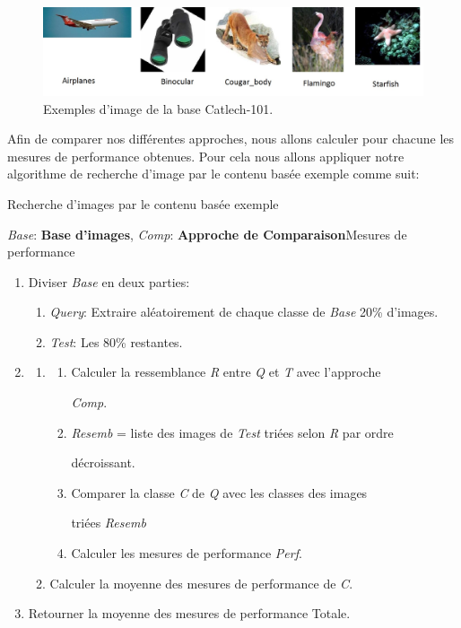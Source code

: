 \begin{figure}[H]
	\centering
		\includegraphics[width=7in]{Figures/caltech101.jpg}
	\caption[An Electron]{Exemples d'image de la base Catlech-101.}
	\label{fig:Electron}
\end{figure}	
	
	
	Afin de comparer nos différentes approches, nous allons calculer pour chacune les mesures de performance obtenues. Pour cela nous allons appliquer notre algorithme de recherche d'image par le contenu basée exemple comme suit:


\begin{algorithme}[H]
\caption{Recherche d'images par le contenu basée exemple}
{\textit{Base}: \textbf{Base d'images}, \textit{Comp}: \textbf{Approche de Comparaison}}{Mesures de performance}
{
\begin{enumerate}


\item Diviser \textit{Base} en deux parties:
\begin{enumerate}[a]
\item \textit{Query}: Extraire aléatoirement de chaque classe de \textit{Base} 20\% d'images.
\item \textit{Test}: Les 80\% restantes.
\end{enumerate}

\item {}
{
\begin{enumerate}
\item {}
{
	\begin{enumerate}[a]
	\item {}
	{
		Calculer la ressemblance \textit{R} entre \textit{Q} et \textit{T} avec l'approche 
		
		\textit{Comp}.
	}
	\item \textit{Resemb} = liste des images de \textit{Test} triées selon \textit{R} par ordre 
	
	
	décroissant.
	\item Comparer la classe \textit{C} de \textit{Q} avec les classes des images 
	
	triées \textit{Resemb}
	\item Calculer les mesures de performance \textit{Perf}.
	\end{enumerate}
}
\item Calculer la moyenne des mesures de performance de \textit{C}.
\end{enumerate}
}
\item Retourner la moyenne des mesures de performance Totale.
\end{enumerate}
}
\end{algorithme}

